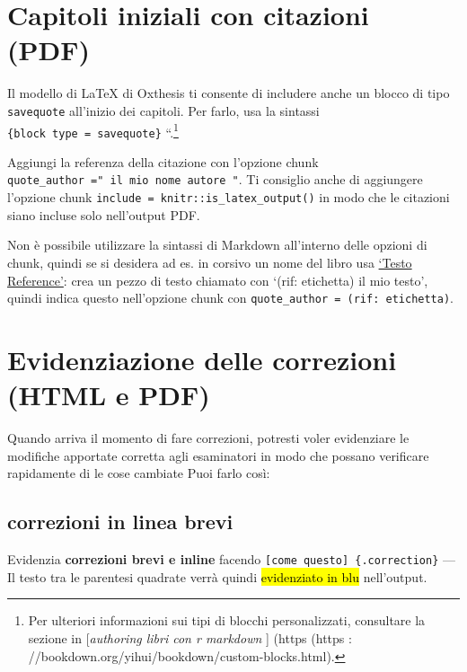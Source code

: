 \documentclass[a4paper, 11pt, nobind]{templates/ociamthesis}
\begin{document}
\hypertarget{capitoli-iniziali-con-citazioni-pdf}{%
\section{Capitoli iniziali con citazioni (PDF)}\label{capitoli-iniziali-con-citazioni-pdf}}

Il modello di LaTeX di Oxthesis ti consente di includere anche un blocco di tipo \texttt{savequote} all'inizio dei capitoli.
Per farlo, usa la sintassi \texttt{} \texttt{\{block\ type\ =\ \textquotesingle{}savequote\textquotesingle{}\}} ``.\footnote{Per ulteriori informazioni sui tipi di blocchi personalizzati, consultare la sezione in {[}\emph{authoring libri con r markdown }{]} (https (https : //bookdown.org/yihui/bookdown/custom-blocks.html).}

Aggiungi la referenza della citazione con l'opzione chunk \texttt{quote\_author\ ="\ il\ mio\ nome\ autore\ "}.
Ti consiglio anche di aggiungere l'opzione chunk \texttt{include\ =\ knitr::is\_latex\_output()} in modo che le citazioni siano incluse solo nell'output PDF.

Non è possibile utilizzare la sintassi di Markdown all'interno delle opzioni di chunk, quindi se si desidera ad es. in corsivo un nome del libro usa \href{https://bookdown.org/yihui/Bookdown/markdown-extensions-by-Bookdown.html\#text-references}{`Testo Reference'}: crea un pezzo di testo chiamato con `(rif: etichetta) il mio testo', quindi indica questo nell'opzione chunk con \texttt{quote\_author\ =\ \textquotesingle{}(rif:\ etichetta)\textquotesingle{}}.

\hypertarget{evidenziazione-delle-correzioni-html-e-pdf}{%
\section{Evidenziazione delle correzioni (HTML e PDF)}\label{evidenziazione-delle-correzioni-html-e-pdf}}

Quando arriva il momento di fare correzioni, potresti voler evidenziare le modifiche apportate corretta agli esaminatori in modo che possano verificare rapidamente di le cose cambiate
Puoi farlo così:

\hypertarget{correzioni-in-linea-brevi}{%
\subsection{correzioni in linea brevi}\label{correzioni-in-linea-brevi}}

Evidenzia \textbf{correzioni brevi e inline } facendo \texttt{{[}come\ questo{]}\ \{.correction\}} --- Il testo tra le parentesi quadrate verrà quindi \hl{evidenziato in blu} nell'output.
\end{document}
